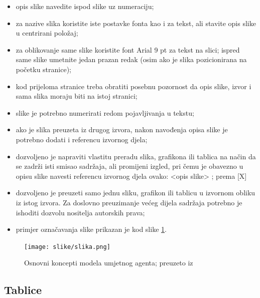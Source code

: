 \documentclass[]{foi}
\begin{document}
\begin{itemize}
	\item opis slike navedite ispod slike uz numeraciju;

	\item za nazive slika koristite iste postavke fonta kao i za tekst, ali stavite opis slike u centrirani položaj;

	\item za oblikovanje same slike koristite font Arial 9 pt za tekst na slici;
	      ispred same slike umetnite jedan prazan redak (osim ako je slika pozicionirana na početku stranice);

	\item kod prijeloma stranice treba obratiti posebnu pozornost da opis slike, izvor i sama slika moraju biti na istoj stranici;

	\item slike je potrebno numerirati redom pojavljivanja u tekstu;

	\item ako je slika preuzeta iz drugog izvora, nakon navođenja opisa slike je potrebno dodati i referencu izvornog djela;

	\item dozvoljeno je napraviti vlastitu preradu slika, grafikona ili tablica na način da se zadrži isti smisao sadržaja, ali promijeni izgled, pri čemu je obavezno u opisu slike navesti referencu izvornog djela ovako: <opis slike> ; prema [X]

	\item dozvoljeno je preuzeti samo jednu sliku, grafikon ili tablicu u izvornom obliku iz istog izvora. Za doslovno preuzimanje većeg dijela sadržaja potrebno je ishoditi dozvolu nositelja autorskih prava;

	\item primjer označavanja slike prikazan je kod slike \ref{fig:podjela}.
\end{itemize}

\begin{figure}[]
	\centering
	\texttt{[image: slike/slika.png]}
	\caption{Osnovni koncepti modela umjetnog agenta; preuzeto iz \cite{russell2022ArtificialIntelligenceModern}}
	\label{fig:podjela}
\end{figure}

\subsection{Tablice}
\end{document}
